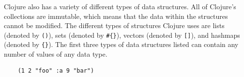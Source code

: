 \documentclass[12pt]{article}
\newcommand{\comment}[1]{{\bf \tt  {#1}}}
\newcommand{\emcomment}[1]{\textcolor{ForestGreen}{\comment{Elena: {#1}}}}
\newcommand{\mmcomment}[1]{\textcolor{magenta}{\comment{Max: {#1}}}}
\begin{document}


Clojure also has a variety of different types of data structures. All 
of Clojure's collections are immutable, which means that the data within the structures cannot be
modified. 
The different types of structures Clojure uses are lists (denoted by \texttt{()}), sets (denoted by
\texttt{\#\{\}}), vectors (denoted by \texttt{[]}), and hashmaps (denoted by \texttt{\{\}}). The first
three types of data structures listed can contain any number of values of any data type.
\begin{verbatim}
	(1 2 "foo" :a 9 "bar")
\end{verbatim}


\end{document}
